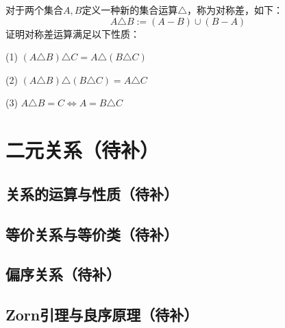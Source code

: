 \begin{prob}[集合的对称差]

对于两个集合$A,B$定义一种新的集合运算$\triangle$，称为对称差，如下：
$$A\triangle B:=(A-B)\cup(B-A)$$
证明对称差运算满足以下性质：

(1) $(A\triangle B)\triangle C=A\triangle(B\triangle C)$

(2) $(A\triangle B)\triangle (B\triangle C)=A\triangle C$

(3) $A\triangle B=C\Leftrightarrow A=B\triangle C$
\end{prob}



\section{二元关系（待补）}
\subsection{关系的运算与性质（待补）}
\subsection{等价关系与等价类（待补）}
\subsection{偏序关系（待补）}
\subsection{Zorn引理与良序原理（待补）}